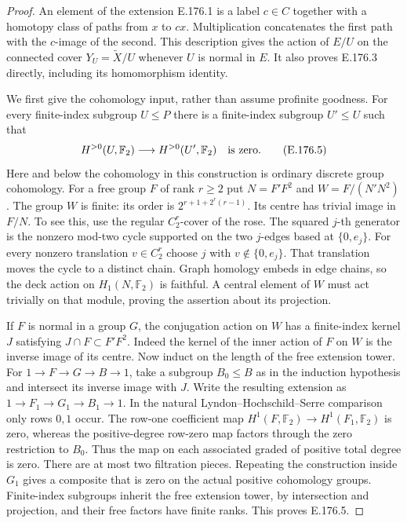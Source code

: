 \begin{proof}
An element of the extension E.176.1 is a label \(c\in C\)
together with a homotopy class of paths from \(x\) to \(cx\).
Multiplication concatenates the first path with the \(c\)-image
of the second.  This description gives the action of \(E/U\)
on the connected cover \(Y_U=\widetilde X/U\) whenever \(U\)
is normal in \(E\).  It also proves E.176.3 directly, including
its homomorphism identity.

We first give the cohomology input, rather than assume
profinite goodness.  For every finite-index subgroup \(U\leq P\)
there is a finite-index subgroup \(U'\leq U\) such that
\[
 H^{>0}(U,\mathbb F_2)\longrightarrow H^{>0}(U',\mathbb F_2)
                         \quad\hbox{is zero}.
\tag{E.176.5}
\]
Here and below the cohomology in this construction is ordinary
discrete group cohomology.  For a free group \(F\) of rank \(r\geq2\)
put \(N=F'F^2\) and \(W=F/(N'N^2)\).  The group \(W\) is finite:
its order is \(2^{r+1+2^r(r-1)}\).  Its centre has trivial image
in \(F/N\).  To see this, use the regular \(C_2^r\)-cover of
the rose.  The squared \(j\)-th generator is the nonzero
mod-two cycle supported on the two \(j\)-edges based at
\(\{0,e_j\}\).  For every nonzero translation \(v\in C_2^r\)
choose \(j\) with \(v\notin\{0,e_j\}\).  That translation moves
the cycle to a distinct chain.  Graph homology embeds in
edge chains, so the deck action on \(H_1(N,\mathbb F_2)\)
is faithful.  A central element of \(W\) must act trivially
on that module, proving the assertion about its projection.

If \(F\) is normal in a group \(G\), the conjugation action
on \(W\) has a finite-index kernel \(J\) satisfying
\(J\cap F\subset F'F^2\).  Indeed the kernel of the inner
action of \(F\) on \(W\) is the inverse image of its centre.
Now induct on the length of the free extension tower.
For \(1\to F\to G\to B\to1\), take a subgroup \(B_0\leq B\)
as in the induction hypothesis and intersect its inverse
image with \(J\).  Write the resulting extension as
\(1\to F_1\to G_1\to B_1\to1\).  In the natural
Lyndon--Hochschild--Serre comparison only rows \(0,1\) occur.
The row-one coefficient map
\(H^1(F,\mathbb F_2)\to H^1(F_1,\mathbb F_2)\) is zero,
whereas the positive-degree row-zero map factors through
the zero restriction to \(B_0\).  Thus the map on each
associated graded of positive total degree is zero.
There are at most two filtration pieces.  Repeating the
construction inside \(G_1\) gives a composite that is zero
on the actual positive cohomology groups.  Finite-index
subgroups inherit the free extension tower, by intersection
and projection, and their free factors have finite ranks.
This proves E.176.5.


\end{proof}

